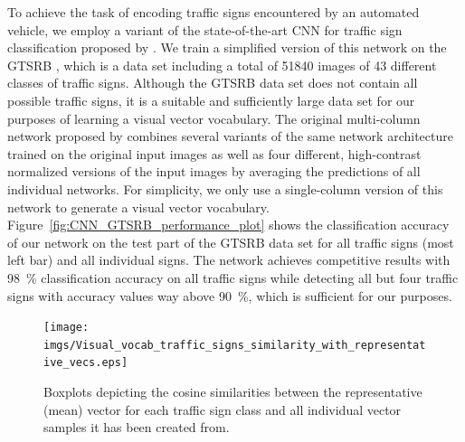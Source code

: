 To achieve the task of encoding traffic signs encountered by an automated vehicle, we employ a variant of the state-of-the-art \ac{CNN} for traffic sign classification proposed by \textcite{Ciresan2012}.
We train a simplified version of this network on the \acf{GTSRB} \parencite{Stallkamp2012}, which is a data set including a total of \num{51840} images of \num{43} different classes of traffic signs.
Although the \ac{GTSRB} data set does not contain all possible traffic signs, it is a suitable and sufficiently large data set for our purposes of learning a visual vector vocabulary.
The original multi-column network proposed by \textcite{Ciresan2012} combines several variants of the same network architecture trained on the original input images as well as four different, high-contrast normalized versions of the input images by averaging the predictions of all individual networks.
For simplicity, we only use a single-column version of this network to generate a visual vector vocabulary. 
Figure~\ref{fig:CNN_GTSRB_performance_plot} shows the classification accuracy of our network on the test part of the \ac{GTSRB} data set for all traffic signs (most left bar) and all individual signs.
The network achieves competitive results with \SI{98}{\percent} classification accuracy on all traffic signs while detecting all but four traffic signs with accuracy values way above \SI{90}{\percent}, which is sufficient for our purposes.

\begin{figure}[t]
    \centering
    \texttt{[image: imgs/Visual\_vocab\_traffic\_signs\_similarity\_with\_representative\_vecs.eps]}
    \caption{Boxplots depicting the cosine similarities between the representative (mean) vector for each traffic sign class and all individual vector samples it has been created from.}
    \label{fig:visual_vocab_traffic_signs_similarity_with_representative_vecs}
    \vspace{-0.4cm}
\end{figure}


